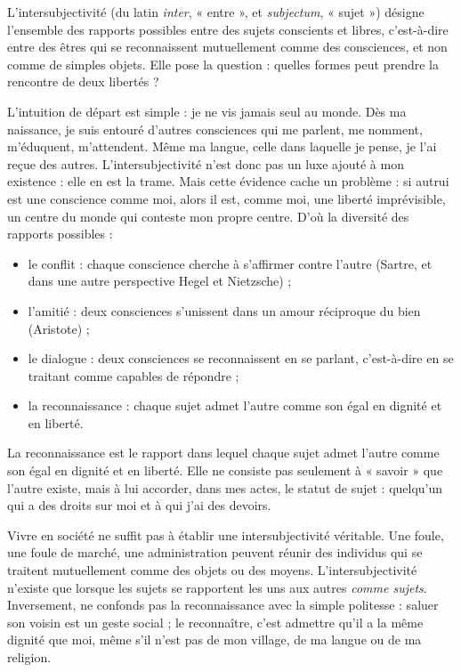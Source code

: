 \documentclass[11pt]{article}
\newcommand{\cle}[1]{{\popxbold\color{popdark}#1}}
\newcounter{popsec}
\newcounter{popsub}
\newcommand{\courssub}[1]{%
  \stepcounter{popsub}%
  \par\vspace{9pt}\noindent{\popxbold\fontsize{11.5}{13}\selectfont\color{popink}{\color{poporange}\thepopsec.\thepopsub}\hspace{6pt}#1}\par\nopagebreak\vspace{4pt}
}
\begin{document}
\courssub{Définir l'intersubjectivité}

\begin{definition}[Intersubjectivité]
L'\cle{intersubjectivité} (du latin \emph{inter}, « entre », et \emph{subjectum}, « sujet ») désigne l'ensemble des rapports possibles entre des sujets conscients et libres, c'est-à-dire entre des êtres qui se reconnaissent mutuellement comme des consciences, et non comme de simples objets. Elle pose la question : quelles formes peut prendre la rencontre de deux libertés ?
\end{definition}

L'intuition de départ est simple : je ne vis jamais seul au monde. Dès ma naissance, je suis entouré d'autres consciences qui me parlent, me nomment, m'éduquent, m'attendent. Même ma langue, celle dans laquelle je pense, je l'ai reçue des autres. L'intersubjectivité n'est donc pas un luxe ajouté à mon existence : elle en est la trame. Mais cette évidence cache un problème : si autrui est une conscience comme moi, alors il est, comme moi, une liberté imprévisible, un centre du monde qui conteste mon propre centre. D'où la diversité des rapports possibles :

\begin{itemize}
\item le \cle{conflit} : chaque conscience cherche à s'affirmer contre l'autre (Sartre, et dans une autre perspective Hegel et Nietzsche) ;
\item l'\cle{amitié} : deux consciences s'unissent dans un amour réciproque du bien (Aristote) ;
\item le \cle{dialogue} : deux consciences se reconnaissent en se parlant, c'est-à-dire en se traitant comme capables de répondre ;
\item la \cle{reconnaissance} : chaque sujet admet l'autre comme son égal en dignité et en liberté.
\end{itemize}

\begin{definition}[Reconnaissance]
La \cle{reconnaissance} est le rapport dans lequel chaque sujet admet l'autre comme son égal en dignité et en liberté. Elle ne consiste pas seulement à « savoir » que l'autre existe, mais à lui accorder, dans mes actes, le statut de sujet : quelqu'un qui a des droits sur moi et à qui j'ai des devoirs.
\end{definition}

\begin{attention}
Vivre en société ne suffit pas à établir une intersubjectivité véritable. Une foule, une foule de marché, une administration peuvent réunir des individus qui se traitent mutuellement comme des objets ou des moyens. L'intersubjectivité n'existe que lorsque les sujets se rapportent les uns aux autres \emph{comme sujets}. Inversement, ne confonds pas la reconnaissance avec la simple politesse : saluer son voisin est un geste social ; le reconnaître, c'est admettre qu'il a la même dignité que moi, même s'il n'est pas de mon village, de ma langue ou de ma religion.
\end{attention}
\end{document}
